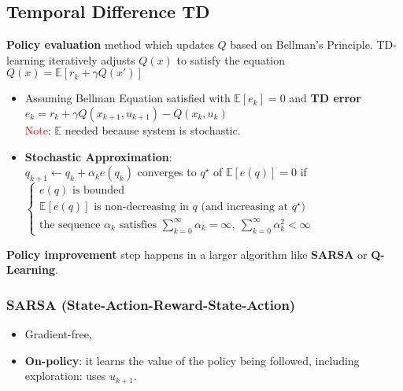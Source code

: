 \subsection{Temporal Difference TD}
\textbf{Policy evaluation} method which updates $Q$ based on Bellman's Principle. TD-learning iteratively adjusts $Q(x)$ to satisfy the equation $Q(x) = \mathbb{E}[r_k + \gamma Q(x')]$
\begin{itemize}
    \item Assuming Bellman Equation satisfied with $\mathbb{E}[e_k] = 0$ and \textbf{TD error} \quad $\boxed{e_k = r_k + \gamma Q(x_{k+1}, u_{k+1}) - Q(x_k, u_k)}$\\
    \textcolor{red}{Note}: $\mathbb{E}$ needed because system is stochastic.
    \item \textcolor{BurntOrange}{\textbf{Stochastic Approximation}}: \\
    $\boxed{q_{k+1} \gets q_k + \alpha_k e(q_k)}$ converges to $q^\star$ of $\mathbb{E}[e(q)] = 0$ if
    $\begin{cases}
        e(q) \text{ is bounded} \\
        \mathbb{E}[e(q)] \text{ is non-decreasing in } q \text{ (and increasing at } q^\star \text{)} \\
        \text{the sequence } \alpha_k \text{ satisfies } \sum_{k=0}^{\infty} \alpha_k = \infty, \ \sum_{k=0}^{\infty} \alpha_k^2 < \infty
    \end{cases}$
\end{itemize}
\textbf{Policy improvement} step happens in a larger algorithm like \textbf{SARSA} or \textbf{Q-Learning}.

\subsubsection{SARSA (State-Action-Reward-State-Action)}
\begin{itemize}
    \item Gradient-free,
    \item \textbf{On-policy}: it learns the value of the policy being followed, including exploration: uses $u_{k+1}$.
\end{itemize}

